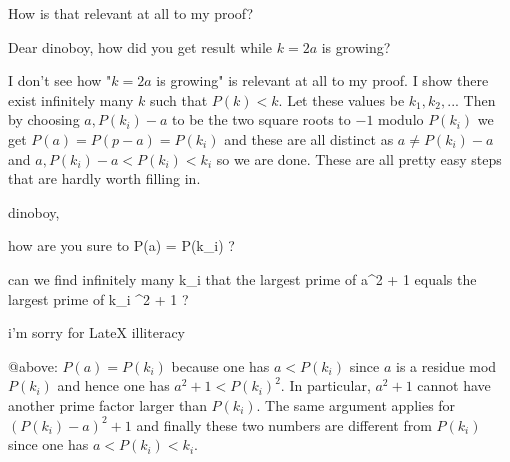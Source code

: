 \begin{solution}
	How is that relevant at all to my proof?
\end{solution}



\begin{solution}
	Dear dinoboy, how did you get result while $k=2a$ is growing?
\end{solution}



\begin{solution}
	I don't see how "$k=2a$ is growing" is relevant at all to my proof. I show there exist infinitely many $k$ such that $P(k) < k$. Let these values be $k_1, k_2,...$ Then by choosing $a,P(k_i)-a$ to be the two square roots to $-1$ modulo $P(k_i)$ we get $P(a) = P(p-a) = P(k_i)$ and these are all distinct as $a \neq P(k_i)-a$ and $a, P(k_i) - a < P(k_i) < k_i$ so we are done. These are all pretty easy steps that are hardly worth filling in.
\end{solution}



\begin{solution}
	dinoboy,

how are you sure to P(a) = P(k_i) ?

can we find infinitely many k_i  that the largest prime of a^2 + 1  equals the largest prime of k_i ^2 + 1 ?

 i'm sorry for LateX illiteracy
\end{solution}



\begin{solution}
	@above: $P(a) = P(k_i)$ because one has $a < P(k_i)$ since $a$ is a residue mod $P(k_i)$ and hence one has $a^2 + 1 < P(k_i)^2$. In particular, $a^2 + 1$ cannot have another prime factor larger than $P(k_i)$. The same argument applies for $(P(k_i) - a)^2 + 1$ and finally these two numbers are different from $P(k_i)$ since one has $a < P(k_i) < k_i$. 
\end{solution}



